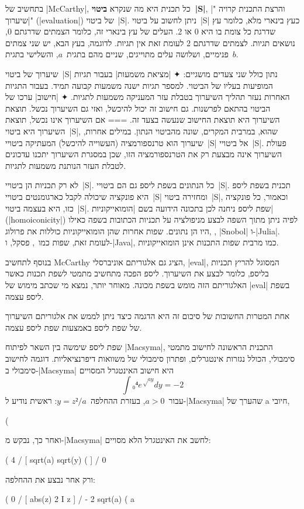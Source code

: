 בתחשיב של \E|McCarthy|, כל תכנית היא מה שנקרא \textbf{ביטוי~\E|S|}, והרצת
התכנית קרויה "\ע|שיערוך|" (\E|evaluation|) של ביטוי~\E|S|. ניתן לחשוב על
ביטוי~\E|S| כעץ בינארי מלא, כלומר עץ שדרגת כל צומת בו היא 0 או 2. העלים של עץ
בינארי זה, כלומר הצמתים שדרגתם 0, נושאים תגיות. לצמתים שדרגתם 2 לעומת זאת אין
תגיות. לדוגמה, בעץ הבא, יש שני צמתים פנימיים, ושלושה עלים מתוייגים, שניים מהם
בתגית~$a$, והשלישי בתגית~$b$.
\begin{quote}
  \center
\end{quote}

שיערוך של ביטוי~\E|S| נתון כולל שני צעדים מושגיים:
✦ \ע|מציאת משמעות| בעבור תגיות המופיעות בעליו של הביטוי. למספר תגיות ישנה
משמעות קבועה תמיד. בעבור התגיות האחרות נעזר תהליך השיערוך בטבלת עזר המעניקה
משמעות לתגיות.
✦ \ע|חישוב| ערכו של הביטוי בהתאם לפרשנות. גם חישוב זה יכול להיכשל, ואזי גם
השיערוך נכשל. תוצאת השיערוך היא תוצאת החישוב שנעשה בצעד זה.
===
אם השיערוך אינו נכשל, תוצאת השיערוך היא ביטוי~\E|S|, שהוא, במרבית המקרים, שונה
מהביטוי הנתון. במילים אחרות, שיערוך הוא טרנספורמציה (העשוייה להיכשל) המעתיקה
ביטויי~\E|S| אל ביטויי~\E|S|. פעולת השיערוך אינה מבצעת רק את הטרנספורמציה הזו,
שכן במסגרת השיערוך יתכנו עדכונים לטבלת העזר הנותנת משמעות לתגיות.

לא רק תכניות הן ביטויי~\E|S|. כל הנתונים בשפת ליספ גם הם ביטויי~\E|S|. תכנית
בשפת ליספ היא פונקציה שיכולה לקבל כארגומנטים ביטויי~\E|S| ומחזירה ביטוי~\E|S|,
וכאמור, כל פונקציה כזו, היא בעצמה ביטוי~\E|S|. שפת ליספ ניחנה לכן בתכונה הידועה
בשם \ע|הומואייקוניות| (\E|homoiconicity|) לפיה ניתן מתוך השפה לבצע מניפולציה על
תכניות הכתובות בשפה כאילו היו הן נתונים. שפות אחרות שהן הומואייקוניות כוללות את
פרולוג, , \E|Snobol| ו-\E|Julia|. לעומת זאת, שפות
כמו~\CPL, פסקל, ו-\E|Java|, כמו מרבית שפות התכנות אינן הומואייקוניות.

בנוסף לתחשיב McCarthy הציג גם אלגוריתם אוניברסלי, \E|eval|, המסוגל להריץ תכניות
בליספ, כלומר לבצע את השיערוך. ליספ הפכה מתחשיב מתמטי לשפת תכנות כאשר האלגוריתם
הזה מומש בשפת מכונה. מאוחר יותר, נמצא מי שכתב מימוש של \E|eval| בשפת ליספ עצמה.

אחת המטרות החשובות של סיכום זה היא הדגמה כיצד ניתן לממש את אלגוריתם השיערוך של
שפת ליספ באמצעות שפת ליספ עצמה.

שפת ליספ שימשה בין השאר לפיתוח \E|Macsyma|, התכנית הראשונה לחישוב מתמטי
סימבולי, הכולל נגזרות אינטגרלים, ופתרון סימבולי של משוואות דיפרנציאליות. דוגמה
לחישוב סימבולי ב-\E|Macsyma| היא חישוב האינטגרל המסויים \[
  ∫₀⁴ e^{√{ay}}dy=-2
\] עבור~$a>0$, בעזרת ההחלפה~$y=z²/a$:
ראשית נודיע ל-\E|Macsyma| שהערך של a חיובי,
\begin{LISP}
(%
\end{LISP}
ואחר כך, נבקש מ-\E|Macsyma| לחשב את האינטגרל הלא מסויים:
\begin{LISP}
(%
 4
 /
 [ sqrt(a) sqrt(y) (%
 ]
 /
 0
\end{LISP}
ורק אחר נבצע את ההחלפה:
\begin{LISP}
(%
 0
 /
 [ abs(z)
 2 I z %
 ]
 /
- 2 sqrt(a)
(%
 a
\end{LISP}

